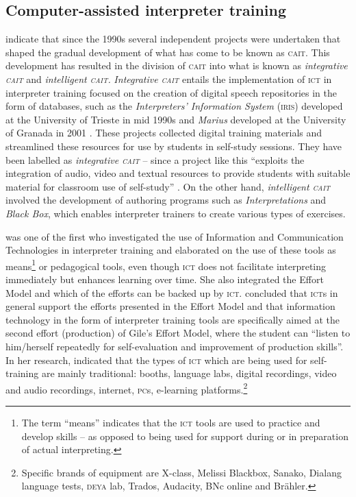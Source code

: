 \documentclass[output=paper]{langsci/langscibook}
\begin{document}
\subsection{Computer-assisted interpreter training}
\citet{Sandrelli2007a} indicate that since the 1990s several independent projects were undertaken that shaped the gradual development of what has come to be known as \textsc{cait}. This development has resulted in the division of \textsc{cait} into what is known as \textit{integrative \textsc{cait}} and \textit{intelligent \textsc{cait}.} \textit{Integrative \textsc{cait}} entails the  implementation of \textsc{ict} in interpreter training focused on the creation of digital speech repositories in the form of databases, such as the \textit{Interpreters’ Information System} (\textsc{iris}) developed at the University of Trieste in mid 1990s \citep{Carabelli1997} and \textit{Marius} developed at the University of Granada in 2001 \citep{Pöchhacker1994}. These projects collected digital training materials and streamlined these resources for use by students in self-study sessions. They have been labelled as \textit{integrative \textsc{cait}} -- since a project like this “exploits the integration of audio, video and textual resources to provide students with suitable material for classroom use of self-study” \citep[277]{Sandrelli2007a}. On the other hand, \textit{intelligent \textsc{cait}} involved the development of authoring programs such as \textit{Interpretations} and \textit{Black Box}, which enables interpreter trainers to create various types of exercises. 

\citet[229]{Berber2010} was one of the first who investigated the use of Information and Communication Technologies in interpreter training and elaborated on the use of these tools as means\footnote{The term “means” indicates that the \textsc{ict} tools are used to practice and develop skills -- as opposed to being used for support during or in preparation of actual interpreting.} or pedagogical tools, even though \textsc{ict} does not facilitate interpreting immediately but enhances learning over time. She also integrated the Effort Model \citep{Gile1995} and which of the efforts can be backed up by \textsc{ict}. \citet[237]{Berber2010} concluded that \textsc{ict}s in general support the efforts presented in the Effort Model and that information technology in the form of interpreter training tools are specifically aimed at the second effort (production) of Gile’s Effort Model, where the student can “listen to him/herself repeatedly for self-evaluation and improvement of production skills”. In her research, \citet[243]{Berber2010} indicated that the types of \textsc{ict} which are being used for self-training are mainly traditional: booths, language labs, digital recordings, video and audio recordings, internet, \textsc{pc}s, e-learning platforms.\footnote{Specific brands of equipment are X-class, Melissi Blackbox, Sanako, Dialang language tests, \textsc{deya} lab, Trados, Audacity, BNc online and Brähler.}
\end{document}
